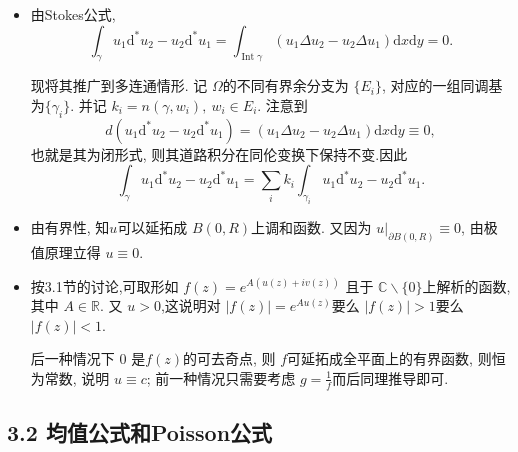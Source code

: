 \begin{itemize}
    \item[3.1.5]

 由Stokes公式,
 $$\int_{\gamma}u_1 \mathrm{d}^{*}u_2 - u_{2} \mathrm{d}^{*}u_1 
 = \int_{\operatorname{Int}\gamma} (u_1 \Delta u_2 - u_2 \Delta u_1) \mathrm{d}x\mathrm{d}y= 0.$$

 现将其推广到多连通情形.  记 $\Omega$的不同有界余分支为 $\{E_i\}$, 
 对应的一组同调基为$\{\gamma_i\}$. 并记 $k_i = n(\gamma,w_i),\ w_i \in E_i$. 
 注意到 
 $$d(u_1 \mathrm{d}^{*}u_2 - u_{2} \mathrm{d}^{*}u_1) 
 =( u_1 \Delta u_2 - u_2 \Delta u_1 )\mathrm{d}x \mathrm{d}y \equiv 0,$$
 也就是其为闭形式, 则其道路积分在同伦变换下保持不变.因此
 $$\int_\gamma u_1 \mathrm{d}^{*}u_2 - u_{2} \mathrm{d}^{*}u_1 
 = \sum_i k_i \int_{\gamma_i}u_1 \mathrm{d}^{*}u_2 - u_{2} \mathrm{d}^{*}u_1.$$

    \item[3.1.6]

 由有界性, 知$u$可以延拓成 $B(0,R)$上调和函数. 
 又因为 $u|_{\partial B(0,R)}\equiv 0$, 由极值原理立得 $u\equiv 0.$ 
 

    \item[3.1.7]

 按3.1节的讨论,可取形如 $f(z) = e^{A(u(z)+iv(z))}$
 且于 $\mathbb{C}\backslash \{0\}$上解析的函数, 其中 $A\in \mathbb{R}$. 
 又 $u>0$,这说明对 $|f(z)| = e^{Au(z)}$要么 $|f(z)|>1$要么$|f(z)|<1.$

 后一种情况下 $0$ 是$f(z)$的可去奇点, 则 $f$可延拓成全平面上的有界函数,
 则恒为常数, 说明 $u\equiv c$; 前一种情况只需要考虑 $g  = \frac{1}{f}$而后同理推导即可.
\end{itemize} 

 \subsection*{3.2 均值公式和Poisson公式}

